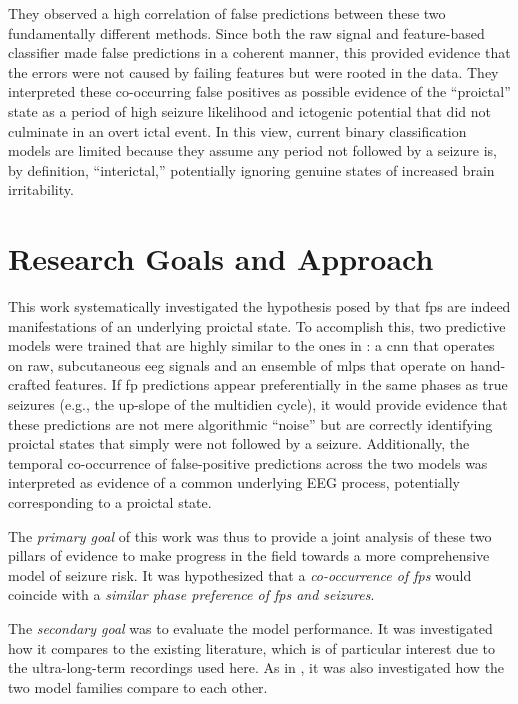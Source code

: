 They observed a high correlation of false predictions between these two fundamentally different methods. 
Since both the raw signal and feature-based classifier made false predictions in a coherent manner, this provided evidence that the errors were not caused by failing features but were rooted in the data. 
They interpreted these co-occurring false positives as possible evidence of the \enquote{proictal} state as a period of high seizure likelihood and ictogenic potential that did not culminate in an overt ictal event. 
In this view, current binary classification models are limited because they assume any period not followed by a seizure is, by definition, \enquote{interictal,} potentially ignoring genuine states of increased brain irritability.



\section{Research Goals and Approach}
This work systematically investigated the hypothesis posed by \textcite{muller_coherent_2022} that \glspl{fp} are indeed manifestations of an underlying proictal state. 
To accomplish this, two predictive models were trained that are highly similar to the ones in \textcite{muller_coherent_2022}: a \gls{cnn} that operates on raw, subcutaneous \gls{eeg} signals and an ensemble of \glspl{mlp} that operate on hand-crafted features.
If \gls{fp} predictions appear preferentially in the same phases as true seizures (e.g., the up-slope of the multidien cycle), it would provide evidence that these predictions are not mere algorithmic \enquote{noise} but are correctly identifying proictal states that simply were not followed by a seizure.
Additionally, the temporal co-occurrence of false-positive predictions across the two models was interpreted as evidence of a common underlying EEG process, potentially corresponding to a proictal state. 

The \textit{primary goal} of this work was thus to provide a joint analysis of these two pillars of evidence to make progress in the field towards a more comprehensive model of seizure risk.
It was hypothesized that a \textit{co-occurrence of \glspl{fp}} would coincide with a \textit{similar phase preference of \glspl{fp} and seizures}.

The \textit{secondary goal} was to evaluate the model performance.
It was investigated how it compares to the existing literature, which is of particular interest due to the ultra-long-term recordings used here.
As in \textcite{muller_coherent_2022}, it was also investigated how the two model families compare to each other.
